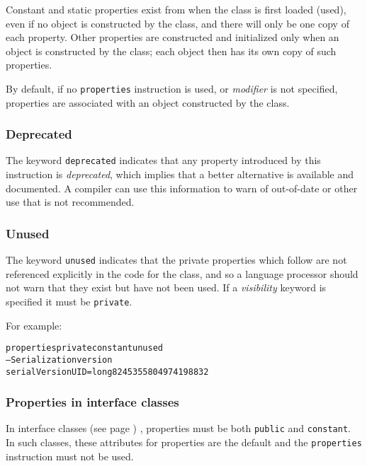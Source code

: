 Constant and static properties exist from when the class is first loaded
(used), even if no object is constructed by the class, and there will
only be one copy of each property.  Other properties are constructed and
initialized only when an object is constructed by the class; each object
then has its own copy of such properties.
 
By default, if no \texttt{properties} instruction is used, or
\emph{modifier} is not specified, properties are associated with an
object constructed by the class.
\subsubsection{Deprecated}\label{"id"}
 
The keyword \texttt{deprecated} indicates that any property introduced by
this instruction is \emph{deprecated}, which implies that a
better alternative is available and documented.  A compiler can
use this information to warn of out-of-date or other use that is
not recommended.
\subsubsection{Unused}\label{"id"}
 
The keyword \texttt{unused} indicates that the private properties
which follow are not referenced explicitly in the code for the class,
and so a language processor should not warn that they exist but have not
been used.
If a \emph{visibility} keyword is specified it must be
\texttt{private}.
 
For example:
\begin{alltt}
properties private constant unused
  -- Serialization version
  serialVersionUID=long 8245355804974198832
\end{alltt}
\subsubsection{Properties in interface classes}
 
In  interface classes (see page \pageref{refinterf}) , properties must be both
\texttt{public} and \texttt{constant}.  In such classes, these
attributes for properties are the default and the \texttt{properties}
instruction must not be used.
